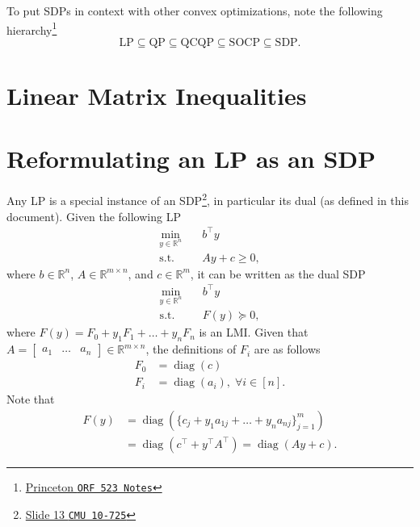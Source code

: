 \documentclass[a4paper]{article}
\DeclareMathOperator{\diag}{diag}
\begin{document}
To put SDPs in context with other convex optimizations, note the following hierarchy\footnote{\href{http://www.princeton.edu/~amirali/Public/Teaching/ORF523/S16/ORF523_S16_Lec9_gh.pdf}{Princeton \texttt{ORF 523 Notes}}}
\begin{equation*}
\text{LP}\subseteq\text{QP}\subseteq\text{QCQP}\subseteq\text{SOCP}\subseteq\text{SDP}.
\end{equation*}

\section*{Linear Matrix Inequalities}

\section*{Reformulating an LP as an SDP}
Any LP is a special instance of an SDP\footnote{\href{http://www.stat.cmu.edu/~ryantibs/convexopt-F13/lectures/18-semidefiniteprogramming.pdf}{Slide 13 \texttt{CMU 10-725}}}, in particular its dual (as defined in this document).
Given the following LP
\begin{equation}\label{eq:general-lp}
\begin{split}
\min_{y\in\mathbb{R}^n}  \quad & b^\top y\\
\textrm{s.t. } \quad & Ay + c \ge 0,
\end{split}
\end{equation}
where $b\in\mathbb{R}^n$, $A\in\mathbb{R}^{m\times n}$, and $c\in\mathbb{R}^m$, it can be written as the dual SDP
\begin{equation}\label{eq:general-lp-sdp}
\begin{split}
\min_{y\in\mathbb{R}^n}  \quad & b^\top y\\
\textrm{s.t. } \quad & F(y) \succeq 0,
\end{split}
\end{equation}
where $F(y) = F_0 + y_1F_1 + \dots + y_nF_n$ is an LMI.
Given that $A = \begin{bmatrix}a_1 & \dots & a_n\end{bmatrix}\in\mathbb{R}^{m\times n}$, the definitions of $F_i$ are as follows
\begin{align*}
F_0 &= \diag(c) \\
F_i &= \diag(a_i),\;\forall i\in[n].
\end{align*}
Note that
\begin{align}
F(y) &= \diag(\{c_j + y_1 a_{1j} + \dots + y_n a_{nj}\}^m_{j=1}) \\
     &= \diag(c^\top + y^\top A^\top) = \diag(Ay + c).
\end{align}
\end{document}
